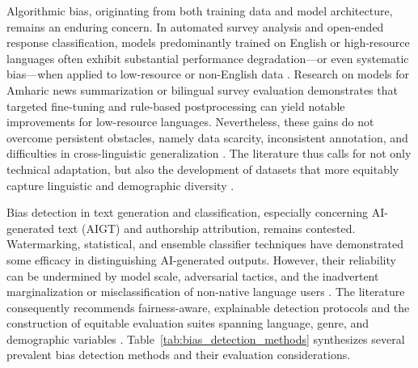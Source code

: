 \documentclass[sigconf]{acmart}
\begin{document}
Algorithmic bias, originating from both training data and model architecture, remains an enduring concern. In automated survey analysis and open-ended response classification, models predominantly trained on English or high-resource languages often exhibit substantial performance degradation—or even systematic bias—when applied to low-resource or non-English data \cite{ref2}\cite{ref9}\cite{ref13}\cite{ref39}\cite{ref64}\cite{ref65}\cite{ref70}\cite{ref81}\cite{ref83}\cite{ref95}\cite{ref97}\cite{ref98}. Research on models for Amharic news summarization or bilingual survey evaluation demonstrates that targeted fine-tuning and rule-based postprocessing can yield notable improvements for low-resource languages. Nevertheless, these gains do not overcome persistent obstacles, namely data scarcity, inconsistent annotation, and difficulties in cross-linguistic generalization \cite{ref13}\cite{ref81}\cite{ref97}\cite{ref98}. The literature thus calls for not only technical adaptation, but also the development of datasets that more equitably capture linguistic and demographic diversity \cite{ref39}\cite{ref82}\cite{ref83}\cite{ref97}\cite{ref98}. 

Bias detection in text generation and classification, especially concerning AI-generated text (AIGT) and authorship attribution, remains contested. Watermarking, statistical, and ensemble classifier techniques have demonstrated some efficacy in distinguishing AI-generated outputs. However, their reliability can be undermined by model scale, adversarial tactics, and the inadvertent marginalization or misclassification of non-native language users \cite{ref15}\cite{ref40}\cite{ref41}\cite{ref66}\cite{ref90}\cite{ref93}\cite{ref96}. The literature consequently recommends fairness-aware, explainable detection protocols and the construction of equitable evaluation suites spanning language, genre, and demographic variables \cite{ref40}\cite{ref70}\cite{ref90}\cite{ref91}\cite{ref97}\cite{ref98}. Table~\ref{tab:bias_detection_methods} synthesizes several prevalent bias detection methods and their evaluation considerations.
\end{document}

